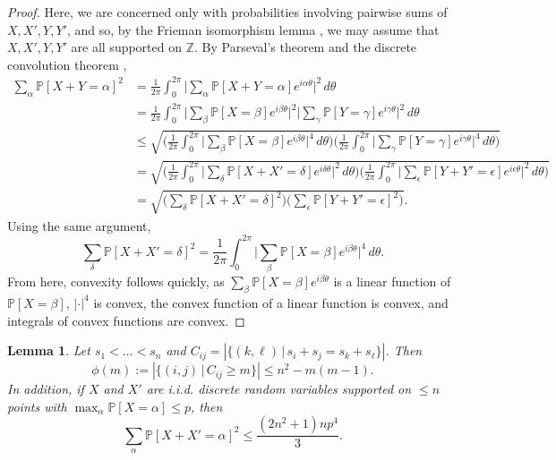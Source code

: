 \documentclass[reqno]{amsart}
\numberwithin{equation}{section}
\newtheorem{lemma}[theorem]{Lemma}
\begin{document}
\begin{proof}
Here, we are concerned only with probabilities involving pairwise sums of $X,X',Y,Y'$, and so, by the Frieman isomorphism lemma \cite[Lemma 5.25]{tao2006additive}, we may assume that $X,X',Y,Y'$ are all supported on $\mathbb{Z}$.
By Parseval's theorem and the discrete convolution theorem \cite[Section 2.9]{oppenheim1999discrete},
\begin{align*}
    \sum_{\alpha} \mathbb{P}\left[X+Y = \alpha\right]^2 &= \frac{1}{2 \pi} \int_{0}^{2 \pi} \Big| \sum_{\alpha} \mathbb{P}\left[X+Y = \alpha\right] e^{i \alpha \theta} \Big|^2 \, d \theta \\
    &= \frac{1}{2 \pi} \int_{0}^{2 \pi} \Big| \sum_{\beta} \mathbb{P}\left[X= \beta \right] e^{i \beta \theta} \Big|^2  \Big| \sum_{\gamma} \mathbb{P}\left[Y = \gamma \right] e^{i \gamma \theta} \Big|^2 \, d \theta \\
    &\le \sqrt{\Big( \frac{1}{2 \pi} \int_{0}^{2 \pi} \Big| \sum_{\beta} \mathbb{P}\left[X= \beta \right] e^{i \beta \theta} \Big|^4 \, d \theta \Big) \Big(\frac{1}{2 \pi} \int_{0}^{2 \pi}  \Big| \sum_{\gamma} \mathbb{P}\left[Y = \gamma \right] e^{i \gamma \theta} \Big|^4 \, d \theta  \Big)} \\
    &= \sqrt{\Big( \frac{1}{2 \pi} \int_{0}^{2 \pi} \Big| \sum_{\delta} \mathbb{P}\left[X + X' = \delta \right] e^{i \delta \theta} \Big|^2 \, d \theta \Big) \Big(\frac{1}{2 \pi} \int_{0}^{2 \pi}  \Big| \sum_{\epsilon} \mathbb{P}\left[Y + Y' = \epsilon \right] e^{i \epsilon \theta} \Big|^2 \, d \theta  \Big)} \\
    &= \sqrt{\Big(\sum_{\delta} \mathbb{P}\left[X+X' = \delta\right]^2 \Big) \Big( \sum_{\epsilon} \mathbb{P}\left[Y+Y' = \epsilon\right]^2\Big)}.
\end{align*}
Using the same argument,
\[\sum_{\delta} \mathbb{P}\left[X+X' = \delta\right]^2 = \frac{1}{2 \pi} \int_{0}^{2 \pi} \Big| \sum_{\beta} \mathbb{P}\left[X= \beta \right] e^{i \beta \theta} \Big|^4 \, d \theta.\]
From here, convexity follows quickly, as $\sum_{\beta} \mathbb{P}\left[X= \beta \right] e^{i \beta \theta}$ is a linear function of $\mathbb{P}\left[X= \beta \right]$, $|\cdot|^4$ is convex, the convex function of a linear function is convex, and integrals of convex functions are convex.
\end{proof}

\begin{lemma}\label{lm:grid}
Let $s_1<\ldots<s_n$ and $C_{ij} = \left| \{ (k,\ell) \, | \, s_i + s_j = s_k + s_{\ell}\}\right|$. Then
\[\phi(m):= \left| \{ (i,j) \, | \, C_{ij} \ge m \} \right| \le n^2 - m(m-1).\]
In addition, if $X$ and $X'$ are i.i.d. discrete random variables supported on $\le n$ points with $\max_{\alpha} \mathbb{P}\left[ X = \alpha \right] \le p$, then
\[\sum_{\alpha} \mathbb{P}\left[ X + X' = \alpha \right]^2 \le \frac{(2n^2+1)n p^4}{3}.\]
\end{lemma}
\end{document}
